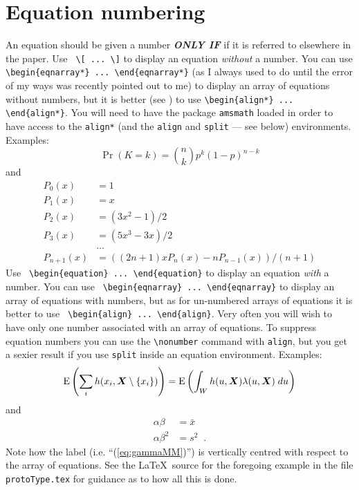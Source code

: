 \documentclass[times, doublespace]{anzsauth}
\begin{document}
\section{Equation numbering}
\label{sec:eqnNumb}
An equation should be given a number \textbf{\textit{ONLY IF}}
if it is referred to elsewhere in the paper.
Use \verb! \[ ... \]! to display an equation \emph{without} a number.
You can use \verb!\begin{eqnarray*} ... \end{eqnarray*}! (as I always
used to do until the error of my ways was recently pointed out to me) to
display an array of equations without numbers, but it is better (see
\citealt{Madsen2006}) to use \verb!\begin{align*} ... \end{align*}!.
You will need to have the package \texttt{amsmath} loaded in order
to have access to the \texttt{align*} (and the \texttt{align}
and \texttt{split} --- see below) environments.  Examples:
\[
\Pr(K = k) = \binom{n}{k} p^k (1-p)^{n-k}
\]
and
\begin{align*}
P_0(x) &= 1 \\
P_1(x) &= x \\
P_2(x) &= (3x^2 - 1)/2 \\
P_3(x) &= (5x^3 - 3x)/2 \\
       & \ldots \\
P_{n+1}(x) &= ((2n+1)xP_n(x) - nP_{n-1}(x))/(n+1)
\end{align*}
Use \verb! \begin{equation} ... \end{equation}! to display an
equation \emph{with} a number.  You can use
\verb! \begin{eqnarray} ... \end{eqnarray}! to display an array of
equations with numbers, but as for un-numbered arrays of equations it
is better to use \verb! \begin{align} ... \end{align}!.  Very often
you will wish to have only one number associated with an array of
equations.  To suppress equation numbers you can use the
\verb!\nonumber! command with \texttt{align}, but you get a sexier
result if you use \texttt{split} inside an equation environment.
Examples:
\begin{equation}
\mbox{$\textrm{\textup{E}}$} \left (\sum_i h(x_i,\mbox{$\boldsymbol{X}$} \setminus \{x_i\}) \right )
= \mbox{$\textrm{\textup{E}}$} \left ( \int_W h(u,\mbox{$\boldsymbol{X}$}) \lambda(u,\mbox{$\boldsymbol{X}$}) \; du \right )
\label{eq:GNZ}
\end{equation}
and
\begin{equation}
\begin{split}
\alpha \beta &= \bar{x} \\
\alpha \beta^2 &= s^2 \;\; .
\end{split}
\label{eq:gammaMM}
\end{equation}
Note how the label (i.e. ``(\ref{eq:gammaMM})'') is vertically
centred with respect to the array of equations.  See the \LaTeX\
source for the foregoing example in the file \texttt{protoType.tex}
for guidance as to how all this is done.
\end{document}
